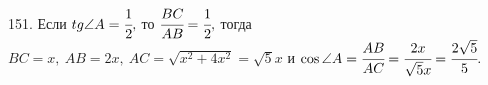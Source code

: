 151. Если $tg\angle A=\cfrac{1}{2},$ то $\cfrac{BC}{AB}=\cfrac{1}{2},$ тогда $BC=x,\ AB=2x,\ AC=\sqrt{x^2+4x^2}=\sqrt{5}x$ и $\cos \angle A=\cfrac{AB}{AC}=\cfrac{2x}{\sqrt{5}x}=\cfrac{2\sqrt{5}}{5}.$\\
